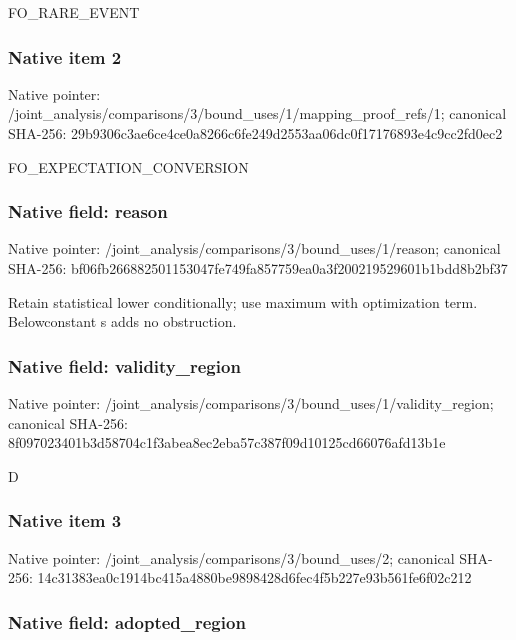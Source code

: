 \documentclass[10pt,a4paper]{article}
\begin{document}
FO\_RARE\_EVENT


\subsubsection{Native item 2}


Native pointer: /joint\_analysis/comparis\allowbreak{}ons/3/bound\_uses/1/mappi\allowbreak{}ng\_proof\_refs/1; canonical SHA-256: 29b9306c3ae6ce4ce0a8266c\allowbreak{}6fe249d2553aa06dc0f17176\allowbreak{}893e4c9cc2fd0ec2


FO\_EXPECTATION\_CONVERSION


\subsubsection{Native field: reason}


Native pointer: /joint\_analysis/comparis\allowbreak{}ons/3/bound\_uses/1/reaso\allowbreak{}n; canonical SHA-256: bf06fb266882501153047fe7\allowbreak{}49fa857759ea0a3f20021952\allowbreak{}9601b1bdd8b2bf37


Retain statistical lower conditionally; use maximum with optimization term. Belowconstant s adds no obstruction.


\subsubsection{Native field: validity\_region}


Native pointer: /joint\_analysis/comparis\allowbreak{}ons/3/bound\_uses/1/valid\allowbreak{}ity\_region; canonical SHA-256: 8f097023401b3d58704c1f3a\allowbreak{}bea8ec2eba57c387f09d1012\allowbreak{}5cd66076afd13b1e


D


\subsubsection{Native item 3}


Native pointer: /joint\_analysis/comparis\allowbreak{}ons/3/bound\_uses/2; canonical SHA-256: 14c31383ea0c1914bc415a48\allowbreak{}80be9898428d6fec4f5b227e\allowbreak{}93b561fe6f02c212



\subsubsection{Native field: adopted\_region}
\end{document}
